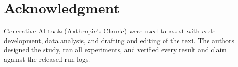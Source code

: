\documentclass[journal]{IEEEtran}
\begin{document}
\section*{Acknowledgment}
Generative AI tools (Anthropic's Claude) were used to assist with code development, data analysis, and drafting and editing of the text. The authors designed the study, ran all experiments, and verified every result and claim against the released run logs.



\end{document}
